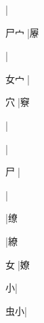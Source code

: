 \begin{multicols}{2}
{{}|{}\par
{\cjk{}尸{宀}{\cnxb{}𡗜}}|{\cjk{}屪}\par
{}|{}\par
{\cjk{}女{宀}{\cnxb{}𡗜}}|{}\par
{\cjk{}{\cnsym{}　}穴{\cnxb{}𡗜}}|{\cjk{}竂}\par
{}|{}\par
{}|{}\par
{\cjk{}{\cnsym{}　}尸{\cnxb{}𡗜}}|{}\par
{}|{}\par
{}|{\cjk{}缭}\par
{}|{\cjk{}繚}\par
{\cjk{}{\cnsym{}　}女{\cnxb{}𡗜}}|{\cjk{}嫽}\par
{\cjk{}{\cnsym{}　}{\cnsym{}　}小}|{}\par
{\cjk{}{\cnsym{}　}虫小}|{}\par
}
\end{multicols}
